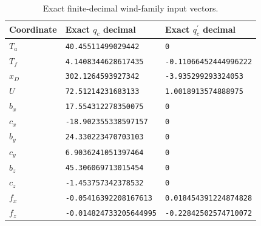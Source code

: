 \begin{table}[htbp]\centering\caption{Exact finite-decimal wind-family input vectors.}\label{tab:windinput}
{\footnotesize\begin{tabular}{lll}\toprule
Coordinate & Exact $q_c$ decimal & Exact $q_c^\prime$ decimal\\\midrule
$T_a$ & \texttt{40.45511499029442} & \texttt{0}\\
$T_f$ & \texttt{4.1408344628617435} & \texttt{-0.11066452444996222}\\
$x_D$ & \texttt{302.1264593927342} & \texttt{-3.935299293324053}\\
$U$ & \texttt{72.51214231683133} & \texttt{1.0018913574888975}\\
$b_x$ & \texttt{17.554312278350075} & \texttt{0}\\
$c_x$ & \texttt{-18.902355338597157} & \texttt{0}\\
$b_y$ & \texttt{24.330223470703103} & \texttt{0}\\
$c_y$ & \texttt{6.9036241051397464} & \texttt{0}\\
$b_z$ & \texttt{45.306069713015454} & \texttt{0}\\
$c_z$ & \texttt{-1.453757342378532} & \texttt{0}\\
$f_x$ & \texttt{-0.05416392208167613} & \texttt{0.018454391224874828}\\
$f_z$ & \texttt{-0.014824733205644995} & \texttt{-0.22842502574710072}\\
\bottomrule\end{tabular}}\end{table}
